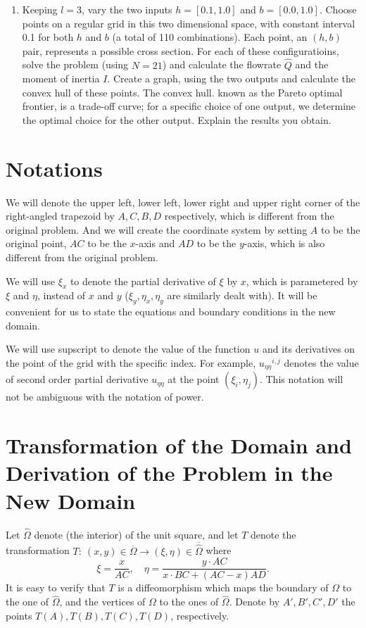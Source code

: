 \documentclass{assignment}[2019/10/15]
\newcommand{\Oh}{\hat{\Omega}}
\newcommand{\uee}{{u_{\eta\eta}}}
\begin{document}
\begin{enumerate}[1)]
        \item Keeping $l = 3$, vary the two inputs $h = [0.1, 1.0]$ and $b = [0.0, 1.0]$. Choose points on a regular grid in this two dimensional space, with constant interval 0.1 for both $h$ and $b$ (a total of 110 combinations). Each point, an $(h, b)$ pair, represents a possible cross section. For each of these configuratioins, solve the problem (using $N = 21$) and calculate the flowrate $\hat Q$ and the moment of inertia $I$. Create a graph, using the two outputs and calculate the convex hull of these points. The convex hull. known as the Pareto optimal frontier, is a trade-off curve; for a specific choice of one output, we determine the optimal choice for the other output. Explain the results you obtain.
    \end{enumerate}

    \section{Notations}

    We will denote the upper left, lower left, lower right and upper right corner of the right-angled trapezoid by $A, C, B, D$ respectively, which is different from the original problem. And we will create the coordinate system by setting $A$ to be the original point, $AC$ to be the $x$-axis and $AD$ to be the $y$-axis, which is also different from the original problem.

    We will use $\xi_x$ to denote the partial derivative of $\xi$ by $x$, which is parametered by $\xi$ and $\eta$, instead of $x$ and $y$ ($\xi_y, \eta_x, \eta_y$ are similarly dealt with). It will be convenient for us to state the equations and boundary conditions in the new domain.

    We will use supscript to denote the value of the function $u$ and its derivatives on the point of the grid with the specific index. For example, $\uee^{i, j}$ denotes the value of second order partial derivative $\uee$ at the point $(\xi_i, \eta_j)$. This notation will not be ambiguous with the notation of power.

    \section{Transformation of the Domain and Derivation of the Problem in the New Domain}

    Let $\Oh$ denote (the interior) of the unit square, and let $T$ denote the transformation $T{:}\ (x, y)\in\overline\Omega \to (\xi, \eta)\in\overline\Oh$ where
    \begin{equation}
        \xi = \frac{x}{AC}, \quad \eta = \frac{y\cdot AC}{x\cdot BC + (AC - x)AD}.
    \end{equation}
    It is easy to verify that $T$ is a diffeomorphism which maps the boundary of $\Omega$ to the one of $\Oh$, and the vertices of $\Omega$ to the ones of $\Oh$. Denote by $A', B', C', D'$ the points $T(A), T(B), T(C), T(D)$, respectively.
\end{document}
